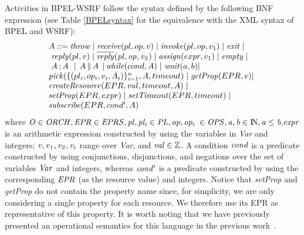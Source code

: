 Activities in BPEL-WSRF follow the syntax defined by the following
BNF expression (see Table \ref{BPELsyntax} for the
equivalence with the XML syntax of BPEL and WSRF):
\vspace{-0.2cm}  
\[\begin{array}{l}
  A ::=  {\it throw} \;|\;           %
         {\it receive}(pl,op,v) \;|\;  %
         {\it invoke}(pl,op,v_1) \;|\;
         {\it exit}\;|\;\\\
         {\it reply}(pl,v)\;|\;  %
         {\it \overline{reply}(pl,op,v_2)}\;|\; 
         {\it assign}(expr,v_1) \;|\;
         {\it empty}\;|\;\\
         \,\,A \,; A \,\, \;|\, %
         \;A \,\| \, A \;\,|\,   %
         {\it while}(cond,A)\;|\
         {\it wait}(a,b)\hspace{-0.1cm}\;|\;\\
         {\it pick}(\{(pl_i,op_i,v_i,A_i)\}_{i=1}^n,A,timeout)\;|\;
         {\it getProp}(EPR,v)\hspace{-0.1cm}\;|\;\\
         {\it createResource}(EPR,val,timeout,A)\;|\;\\
         {\it setProp}(EPR,expr)\;|\;
         {\it setTimeout}(EPR,timeout)\;|\;\\
         {\it subscribe}(EPR,cond',A)
\end{array}
\]
\vspace{-0.1cm}
\noindent \hspace{0.4cm}where ${\it O \in ORCH, EPR \in EPRS , pl,pl_{i} \in PL, op,op_{i}}$ ${\it \in OPS, a,b \in {\rm I\! N},a\leq b,} \\ {\it  expr}$ is an arithmetic expression constructed by using the variables in {\it Var} and integers; ${\it v,v_1,v_2,v_i}$ range over {\it Var}, and ${\it val \in \mathbb{Z}}$. A condition ${\it cond}$ is a predicate constructed by using conjunctions, disjunctions, and negations over the set of variables ${\it Var}$ and integers, whereas ${\it cond'}$ is a predicate constructed by using the corresponding ${\it EPR}$ (as the resource value) and integers. Notice that \emph{setProp} and \emph{getProp} do not contain the property name since, for simplicity, 
we are only considering a single property for each resource.
We therefore use its EPR as representative of this property. It is worth noting that we have previously presented an operational semantics for this language in the previous
work~\cite{wsfm2011}.

